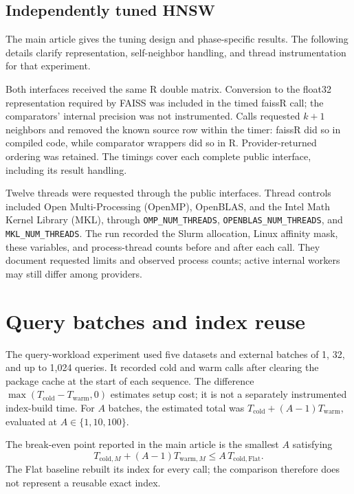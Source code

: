 \documentclass[11pt]{article}
\newcommand{\code}[1]{\texttt{#1}}
\newcommand{\pkg}[1]{\textsf{#1}}
\begin{document}
\subsection{Independently tuned HNSW}

The main article gives the tuning design and phase-specific results. The
following details clarify representation, self-neighbor handling, and thread
instrumentation for that experiment.

Both interfaces received the same R double matrix. Conversion to the float32
representation required by FAISS was included in the timed \pkg{faissR}
call; the comparators' internal precision was not instrumented. Calls
requested $k+1$ neighbors and removed the known source row within the timer:
\pkg{faissR} did so in compiled code, while comparator wrappers did so in R.
Provider-returned ordering was retained. The timings cover each complete
public interface, including its result handling.

Twelve threads were requested through the public interfaces. Thread controls
included Open Multi-Processing (OpenMP), OpenBLAS, and the Intel Math Kernel
Library (MKL), through \code{OMP\_NUM\_THREADS},
\code{OPENBLAS\_NUM\_THREADS}, and \code{MKL\_NUM\_THREADS}. The run recorded
the Slurm allocation, Linux affinity mask, these variables, and process-thread
counts before and after each call. They document requested limits and observed
process counts; active internal workers may still differ among providers.

\section{Query batches and index reuse}
\label{sec:supp-workload}

The query-workload experiment used five datasets and external batches of 1,
32, and up to 1,024 queries. It recorded cold and warm calls after clearing
the package cache at the start of each sequence. The difference
$\max(T_{\mathrm{cold}}-T_{\mathrm{warm}},0)$ estimates setup cost; it is not
a separately instrumented index-build time. For $A$ batches, the estimated
total was $T_{\mathrm{cold}}+(A-1)T_{\mathrm{warm}}$, evaluated at
$A\in\{1,10,100\}$.

The break-even point reported in the main article is the smallest $A$
satisfying
\[
T_{\mathrm{cold},M}+(A-1)T_{\mathrm{warm},M}
\leq A\,T_{\mathrm{cold},\mathrm{Flat}}.
\]
The Flat baseline rebuilt its index for every call; the comparison therefore
does not represent a reusable exact index.
\end{document}
